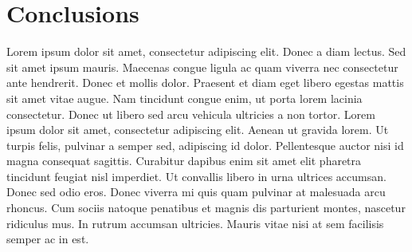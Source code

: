 \documentclass[a0, 30pt]{sciposter}
\begin{document}
\begin{multicols}{2}
  
  \usualsep\usualsep\usualsep
  \begin{center}
  \end{center}
  
  
  \section{Conclusions}
  
  Lorem ipsum dolor sit amet, consectetur adipiscing elit. Donec a
  diam lectus. Sed sit amet ipsum mauris. Maecenas congue ligula ac
  quam viverra nec consectetur ante hendrerit. Donec et mollis
  dolor. Praesent et diam eget libero egestas mattis sit amet vitae
  augue. Nam tincidunt congue enim, ut porta lorem lacinia
  consectetur. Donec ut libero sed arcu vehicula ultricies a non
  tortor. Lorem ipsum dolor sit amet, consectetur adipiscing
  elit. Aenean ut gravida lorem. Ut turpis felis, pulvinar a semper
  sed, adipiscing id dolor. Pellentesque auctor nisi id magna
  consequat sagittis. Curabitur dapibus enim sit amet elit pharetra
  tincidunt feugiat nisl imperdiet. Ut convallis libero in urna
  ultrices accumsan. Donec sed odio eros. Donec viverra mi quis quam
  pulvinar at malesuada arcu rhoncus. Cum sociis natoque penatibus et
  magnis dis parturient montes, nascetur ridiculus mus. In rutrum
  accumsan ultricies. Mauris vitae nisi at sem facilisis semper ac in
  est.
  
  
  
\end{multicols}
\end{document}
